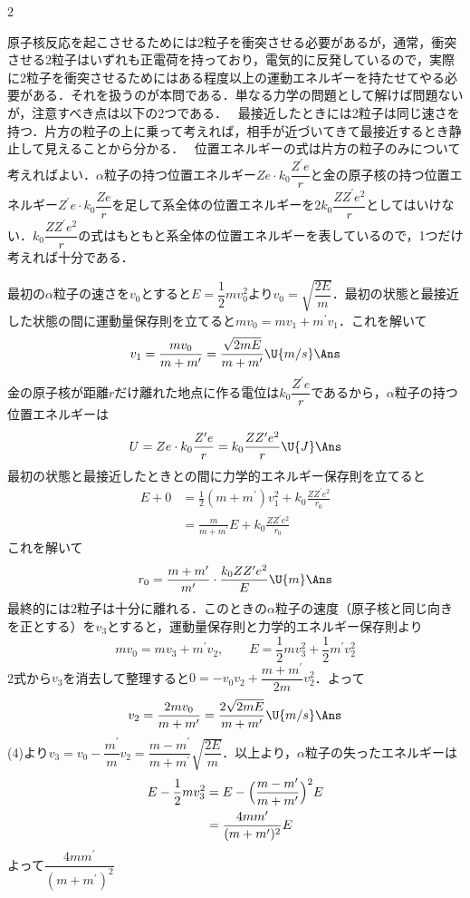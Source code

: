 \begin{multicols}{2}
\par\nopagebreak
\begin{sisin}
原子核反応を起こさせるためには2粒子を衝突させる必要があるが，通常，衝突させる2粒子はいずれも正電荷を持っており，電気的に反発しているので，実際に2粒子を衝突させるためにはある程度以上の運動エネルギーを持たせてやる必要がある．それを扱うのが本問である．単なる力学の問題として解けば問題ないが，注意すべき点は以下の2つである．
\ 最接近したときには2粒子は同じ速さを持つ．片方の粒子の上に乗って考えれば，相手が近づいてきて最接近するとき静止して見えることから分かる．
\ 位置エネルギーの式は片方の粒子のみについて考えればよい．$\alpha$粒子の持つ位置エネルギー$Ze\cdot k_0\dfrac{Z^\prime e}{r}$と金の原子核の持つ位置エネルギー$Z^\prime e\cdot k_0\dfrac{Ze}{r}$を足して系全体の位置エネルギーを$2k_0\dfrac{ZZ^\prime e^2}{r}$としてはいけない．$k_0\dfrac{ZZ^\prime e^2}{r}$の式はもともと系全体の位置エネルギーを表しているので，1つだけ考えれば十分である．
\end{sisin}
\KaiHead
\begin{komon}
 最初の$\alpha$粒子の速さを$v_0$とすると$E=\dfrac{1}{2}mv_0^2$より$v_0=\sqrt{\dfrac{2E}{m}}$．最初の状態と最接近した状態の間に運動量保存則を立てると$mv_0=mv_1+m^\prime v_1$．これを解いて
       \[v_1=\frac{mv_0}{m+m^\prime}=\frac{\sqrt{2mE}}{m+m^\prime}\U{m/s}\Ans\]
 金の原子核が距離$r$だけ離れた地点に作る電位は$k_0\dfrac{Z^\prime e}{r}$であるから，$\alpha$粒子の持つ位置エネルギーは
       \[U=Ze\cdot k_0\frac{Z^\prime e}{r}=k_0\frac{ZZ^\prime e^2}{r}\U{J}\Ans\]
 最初の状態と最接近したときとの間に力学的エネルギー保存則を立てると
       \[\begin{aligned}E+0&=\frac{1}{2}(m+m^\prime)v_1^2+k_0\frac{ZZ^\prime e^2}{r_0}\\&=\frac{m}{m+m^\prime}E+k_0\frac{ZZ^\prime e^2}{r_0}\end{aligned}\]
       これを解いて
       \[r_0=\frac{m+m^\prime}{m^\prime}\cdot\frac{k_0ZZ^\prime e^2}{E}\U{m}\Ans\]
 最終的には2粒子は十分に離れる．このときの$\alpha$粒子の速度（原子核と同じ向きを正とする）を$v_3$とすると，運動量保存則と力学的エネルギー保存則より
       \[mv_0=mv_3+m^\prime v_2,\qquad E=\frac{1}{2}mv_3^2+\frac{1}{2}m^\prime v_2^2\]
       2式から$v_3$を消去して整理すると$0=-v_0v_2+\dfrac{m+m^\prime}{2m}v_2^2$．よって
       \[v_2=\frac{2mv_0}{m+m^\prime}=\frac{2\sqrt{2mE}}{m+m^\prime}\U{m/s}\Ans\]
 (4)より$v_3=v_0-\dfrac{m^\prime}{m}v_2=\dfrac{m-m^\prime}{m+m^\prime}\sqrt{\dfrac{2E}{m}}$．以上より，$\alpha$粒子の失ったエネルギーは
       \[\begin{aligned}E-\frac{1}{2}mv_3^2&=E-\Bigl(\frac{m-m^\prime}{m+m^\prime}\Bigr)^2E\\&=\frac{4mm^\prime}{(m+m^\prime)^2}E\end{aligned}\]
       よって\quad $\dfrac{4mm^\prime}{(m+m^\prime)^2}$\Ans
\end{komon}


\end{multicols}
